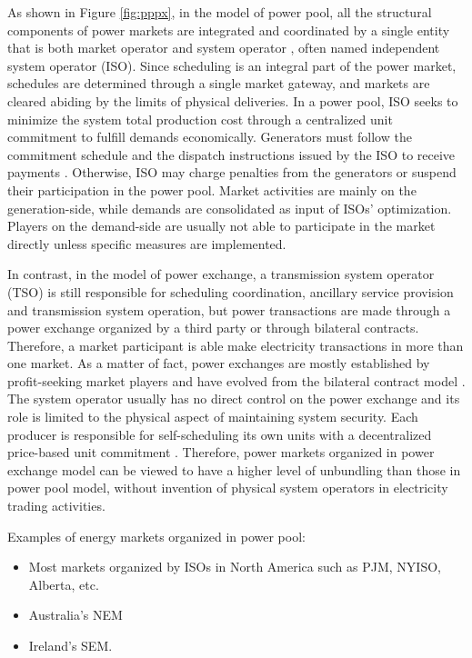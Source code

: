 As shown in Figure \ref{fig:pppx}, in the model of power pool, all the structural components of power markets are integrated and coordinated by a single entity that is both market operator and system operator  \cite{Srivastava2011,Barroso2005}, often named independent system operator (ISO). Since scheduling is an integral part of the power market, schedules are determined through a single market gateway, and markets are cleared abiding by the limits of physical deliveries.  In a power pool, ISO seeks to minimize the system total production cost through a centralized unit commitment to fulfill demands economically. Generators must follow the commitment schedule and the dispatch instructions issued by the ISO to receive payments \cite{Kardakos2013}. Otherwise, ISO may charge penalties from the generators or suspend their participation in the power pool. Market activities are mainly on the generation-side, while demands are consolidated as input of ISOs' optimization. Players on the demand-side are usually not able to participate in the market directly unless specific measures are implemented.

In contrast, in the model of power exchange, a transmission system operator (TSO) is still responsible for scheduling coordination, ancillary service provision and transmission system operation, but power transactions are made through a power exchange organized by a third party or through bilateral contracts. Therefore, a market participant is able make electricity transactions in more than one market. As a matter of fact, power exchanges are mostly established by profit-seeking market players and have evolved from the bilateral contract model \cite{Barroso2005}. The system operator usually has no direct control on the power exchange and its role is limited to the physical aspect of maintaining system security. Each producer is responsible for self-scheduling its own units with a decentralized price-based unit commitment \cite{Kardakos2013}. Therefore, power markets organized in power exchange model can be viewed to have a higher level of unbundling than those in power pool model, without invention of physical system operators in electricity trading activities.

Examples of energy markets organized in power pool:
	\begin{itemize}
		\item Most markets organized by ISOs in North America such as PJM, NYISO, Alberta, etc.
		\item Australia's NEM
		\item Ireland's SEM.
	\end{itemize}

